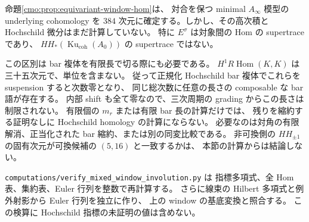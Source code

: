\begin{remark}
\label{cmo:rem:window-not-hochschild}
命題\ref{cmo:prop:equivariant-window-hom}は、
対合を保つ minimal $A_\infty$ 模型の underlying cohomology を
$384$ 次元に確定する。しかし、その高次積と Hochschild 微分はまだ計算していない。
特に $E^\sigma$ は対象間の Hom の supertrace であり、
$HH_*(\operatorname{Ku}_{\mathrm{coh}}(A_0))$ の supertrace ではない。

この区別は bar 複体を有限長で切る際にも必要である。
$H^1R\operatorname{Hom}(K,K)$ は三十五次元で、単位を含まない。
従って正規化 Hochschild bar 複体でこれらを suspension すると次数零となり、
同じ総次数に任意の長さの composable な bar 語が存在する。
内部 shift も全て零なので、三次周期の grading からこの長さは制限されない。
有限個の $m_r$ または有限 bar 長の計算だけでは、
残りを縮約する証明なしに Hochschild homology の計算にならない。
必要なのは対角の有限解消、正当化された bar 縮約、または別の同変比較である。
非可換側の $HH_{\pm1}$ の固有次元が可換候補の $(5,16)$ と一致するかは、
本節の計算からは結論しない。

\texttt{computations/verify\_mixed\_window\_involution.py} は
指標多項式、全 Hom 表、集約表、Euler 行列を整数で再計算する。
さらに線束の Hilbert 多項式と例外射影から Euler 行列を独立に作り、
上の window の基底変換と照合する。
この検算に Hochschild 指標の未証明の値は含めない。
\end{remark}
